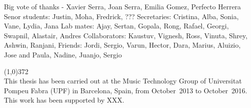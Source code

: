 
Big vote of thanks - Xavier Serra, Joan Serra, Emilia Gomez, Perfecto Herrera
Senor students: Justin, Moha, Fredrick, ???
Secretaries: Cristina, Alba, Sonia, Vane, Lydia, Jana
Lab mates: Ajay, Sertan, Gopala, Rong, Rafael, Georgi, Swapnil, Alastair, Andres
Collaborators: Kaustuv, Vignesh, Ross, Vinuta, Shrey, Ashwin, Ranjani, 
Friends: Jordi, Sergio, Varun, Hector, Dara, Marius, Aluizio, Jose and Paula, Nadine, Juanjo, Sergio

\vspace*{\fill}

\line(1,0){372}\\
\footnotesize
This thesis has been carried out at the Music Technology Group of Universitat Pompeu Fabra (UPF) in Barcelona, Spain, from October~2013 to October~2016. This work has been supported by XXX.
\normalsize